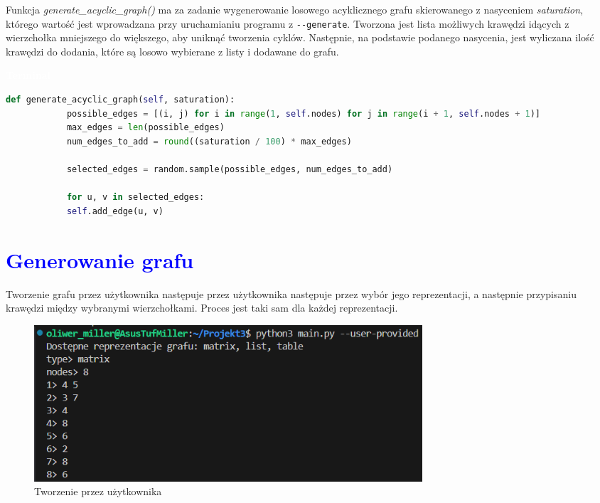 \documentclass{article}
\begin{document}
	
	\begin{multicols}{2}
	\noindent Funkcja \textit{generate\_acyclic\_graph()} ma za zadanie wygenerowanie losowego acyklicznego grafu skierowanego z nasyceniem \textit{saturation}, którego wartość jest wprowadzana przy uruchamianiu programu z \verb|--generate|. Tworzona jest lista możliwych krawędzi idących z wierzchołka mniejszego do większego, aby uniknąć tworzenia cyklów. Następnie, na podstawie podanego nasycenia, jest wyliczana ilość krawędzi do dodania, które są losowo wybierane z listy i dodawane do grafu.
	
	\begin{tcolorbox}[colback=black,colframe=gray!50!,arc=3mm,boxrule=0pt,left=0pt,right=0pt,width=\linewidth]
		\textcolor{white}{\textbf{\textsf{Terminal}}}\\
	\begin{lstlisting}[language=Python]
		def generate_acyclic_graph(self, saturation):
			possible_edges = [(i, j) for i in range(1, self.nodes) for j in range(i + 1, self.nodes + 1)]
			max_edges = len(possible_edges)
			num_edges_to_add = round((saturation / 100) * max_edges)
			
			selected_edges = random.sample(possible_edges, num_edges_to_add)
			
			for u, v in selected_edges:
			self.add_edge(u, v)
	\end{lstlisting}
	
	\end{tcolorbox}
	\end{multicols}
	
	
	
	\newpage
	
	\section*{\textcolor{blue}{Generowanie grafu}}
	\noindent Tworzenie grafu przez użytkownika następuje przez użytkownika następuje przez wybór jego reprezentacji, a następnie przypisaniu krawędzi między wybranymi wierzchołkami. Proces jest taki sam dla każdej reprezentacji.
	
	\begin{figure}[htbp]
		\centering
		\includegraphics[width=0.7\textwidth]{reprezentacja_matrix_g.png} 
		\caption{Tworzenie przez użytkownika}
		\label{fig:moje-zdjecie}
	\end{figure}
	
\end{document}
